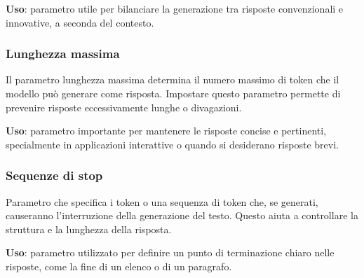             \textbf{Uso}: parametro utile per bilanciare la generazione tra risposte convenzionali e innovative, a seconda del contesto.
        
        \subsubsection{Lunghezza massima}
            Il parametro lunghezza massima determina il numero massimo di token che il modello può generare come risposta.	Impostare questo parametro permette di prevenire risposte eccessivamente lunghe o divagazioni.

            \textbf{Uso}: parametro importante per mantenere le risposte concise e pertinenti, specialmente in applicazioni interattive o quando si desiderano risposte brevi.
            
        \subsubsection{Sequenze di stop}
            Parametro che specifica i token o una sequenza di token che, se generati, causeranno l'interruzione della generazione del testo. Questo aiuta a controllare la struttura e la lunghezza della risposta.

            \textbf{Uso}: parametro utilizzato per definire un punto di terminazione chiaro nelle risposte, come la fine di un elenco o di un paragrafo.
            
